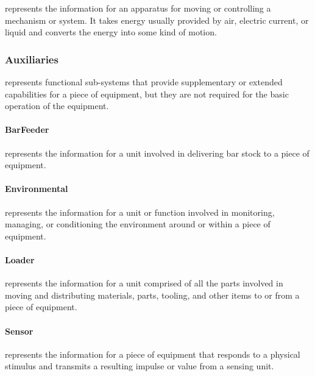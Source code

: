  represents the information for an apparatus for moving or controlling a mechanism or system. It takes energy usually provided by air, electric current, or liquid and converts the energy into some kind of motion.


\subsubsection{Auxiliaries}
\label{sec:Auxiliaries}



 represents functional sub-systems that provide supplementary or extended capabilities for a piece of equipment, but they are not required for the basic operation of the equipment.


\paragraph{BarFeeder}\mbox{}
\label{sec:BarFeeder}


 represents the information for a unit involved in delivering bar stock to a piece of equipment.


\paragraph{Environmental}\mbox{}
\label{sec:Environmental}


 represents the information for a unit or function involved in monitoring, managing, or conditioning the environment around or within a piece of equipment.


\paragraph{Loader}\mbox{}
\label{sec:Loader}


 represents the information for a unit comprised of all the parts involved in moving and distributing materials, parts, tooling, and other items to or from a piece of equipment.


\paragraph{Sensor}\mbox{}
\label{sec:Sensor}


 represents the information for a piece of equipment that responds to a physical stimulus and transmits a resulting impulse or value from a sensing unit.


